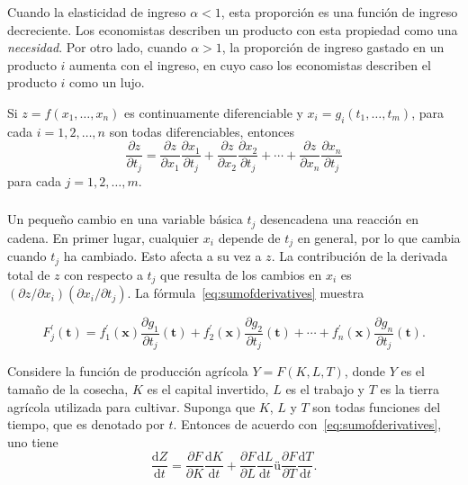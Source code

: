 \begin{frame}[t]
\frametitle{\subsecname}
Cuando la elasticidad de ingreso $\alpha<1$, esta proporción es una función de ingreso decreciente. Los economistas describen un producto con esta propiedad como una \emph{necesidad}. Por otro lado, cuando $\alpha>1$, la proporción de ingreso gastado en un producto $i$ aumenta con el ingreso, en cuyo caso los economistas describen el producto $i$ como un lujo.

\begin{remark}
Si $z=f\left(x_{1},\ldots,x_{n}\right)$ es continuamente diferenciable y $x_{i}=g_{i}\left(t_{1},\ldots,t_{m}\right)$, para cada $i=1,2,\ldots,n$ son todas diferenciables, entonces \[ \frac{\partial z}{\partial t_{j}}=\frac{\partial z}{\partial x_{1}}\frac{\partial x_{1}}{\partial t_{j}}+\frac{\partial z}{\partial x_{2}}\frac{\partial x_{2}}{\partial t_{j}}+\cdots+\frac{\partial z}{\partial x_{n}}\frac{\partial x_{n}}{\partial t_{j}} \] para cada $j=1,2,\ldots,m$.
\end{remark}
\end{frame}

\begin{frame}[t]
\frametitle{\subsecname}
Un pequeño cambio en una variable básica $t_{j}$ desencadena una reacción en cadena. En primer lugar, cualquier $x_{i}$ depende de $t_{j}$ en general, por lo que cambia cuando $t_{j}$ ha cambiado. Esto afecta a su vez a $z$. La contribución de la derivada total de $z$ con respecto a $t_{j}$ que resulta de los cambios en $x_{i}$ es $\left(\partial z/\partial x_{i}\right)\left(\partial x_{i}/\partial t_{j}\right)$. La fórmula~\eqref{eq:sumofderivatives} muestra

\begin{equation}\label{eq:sumofderivatives}
F^{\prime}_{j}\left(\bm{t}\right)=f^{\prime}_{1}\left(\bm{x}\right)\frac{\partial g_{1}}{\partial t_{j}}\left(\bm{t}\right)+f^{\prime}_{2}\left(\bm{x}\right)\frac{\partial g_{2}}{\partial t_{j}}\left(\bm{t}\right)+\cdots+f^{\prime}_{n}\left(\bm{x}\right)\frac{\partial g_{n}}{\partial t_{j}}\left(\bm{t}\right).
\end{equation}




\begin{example}
Considere la función de producción agrícola $Y=F\left(K,L,T\right)$, donde $Y$ es el tamaño de la cosecha, $K$ es el capital invertido, $L$ es el trabajo y $T$ es la tierra agrícola utilizada para cultivar. Suponga que $K$, $L$ y $ T$ son todas funciones del tiempo, que es denotado por $t$. Entonces de acuerdo con~\eqref{eq:sumofderivatives}, uno tiene
\[ \dfrac{\mathrm{d}Z}{\mathrm{d}t}=\frac{\partial F}{\partial K}\frac{\mathrm{d}K}{\mathrm{d} t}+\frac{\partial F}{\partial L}\frac{\mathrm{d}L}{\mathrm{d}t}ü\frac{\partial F}{\partial T}\frac{\mathrm{d}T}{\mathrm{d}t}. \]
\end{example}
\end{frame}

